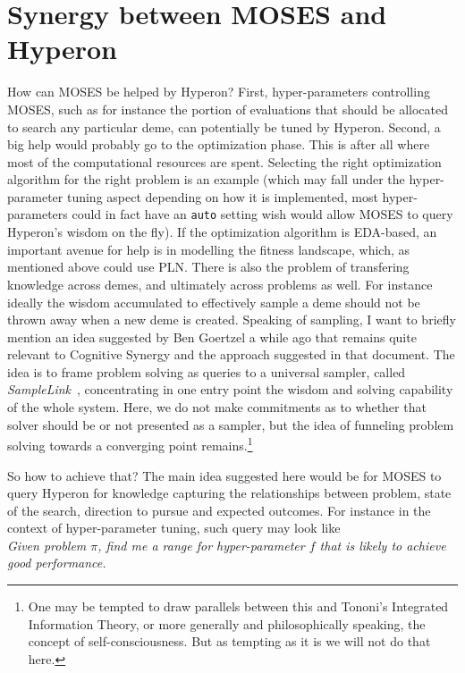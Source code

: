 \documentclass[]{report}
\begin{document}
\section{Synergy between MOSES and Hyperon}

How can MOSES be helped by Hyperon?  First, hyper-parameters
controlling MOSES, such as for instance the portion of evaluations
that should be allocated to search any particular deme, can
potentially be tuned by Hyperon.  Second, a big help would probably go
to the optimization phase.  This is after all where most of the
computational resources are spent.  Selecting the right optimization
algorithm for the right problem is an example (which may fall under
the hyper-parameter tuning aspect depending on how it is implemented,
most hyper-parameters could in fact have an \texttt{auto} setting wish
would allow MOSES to query Hyperon's wisdom on the fly).  If the
optimization algorithm is EDA-based, an important avenue for help is
in modelling the fitness landscape, which, as mentioned above could
use PLN.  There is also the problem of transfering knowledge across
demes, and ultimately across problems as well.  For instance ideally
the wisdom accumulated to effectively sample a deme should not be
thrown away when a new deme is created.  Speaking of sampling, I want
to briefly mention an idea suggested by Ben Goertzel a while ago that
remains quite relevant to Cognitive Synergy and the approach suggested
in that document.  The idea is to frame problem solving as queries to
a universal sampler, called \emph{SampleLink}~\cite{SampleLink},
concentrating in one entry point the wisdom and solving capability of
the whole system.  Here, we do not make commitments as to whether that
solver should be or not presented as a sampler, but the idea of
funneling problem solving towards a converging point
remains.\footnote{One may be tempted to draw parallels between this
and Tononi's Integrated Information Theory, or more generally and
philosophically speaking, the concept of self-consciousness.  But as
tempting as it is we will not do that here.}

So how to achieve that?  The main idea suggested here would be for
MOSES to query Hyperon for knowledge capturing the relationships
between problem, state of the search, direction to pursue and expected
outcomes.  For instance in the context of hyper-parameter tuning, such
query may look like\\

\emph{Given problem $\pi$, find me a range for hyper-parameter $f$
that is likely to achieve good performance.}\\
\end{document}
